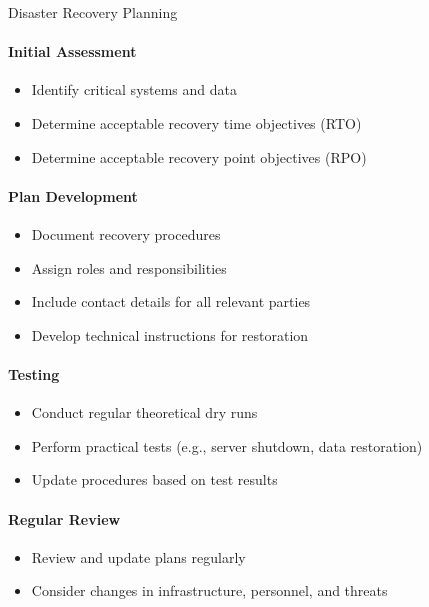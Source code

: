\begin{KR}{Disaster Recovery Planning}
\paragraph{Initial Assessment}
\begin{itemize}
    \item Identify critical systems and data
    \item Determine acceptable recovery time objectives (RTO)
    \item Determine acceptable recovery point objectives (RPO)
\end{itemize}

\paragraph{Plan Development}
\begin{itemize}
    \item Document recovery procedures
    \item Assign roles and responsibilities
    \item Include contact details for all relevant parties
    \item Develop technical instructions for restoration
\end{itemize}

\paragraph{Testing}
\begin{itemize}
    \item Conduct regular theoretical dry runs
    \item Perform practical tests (e.g., server shutdown, data restoration)
    \item Update procedures based on test results
\end{itemize}

\paragraph{Regular Review}
\begin{itemize}
    \item Review and update plans regularly
    \item Consider changes in infrastructure, personnel, and threats
\end{itemize}
\end{KR}

